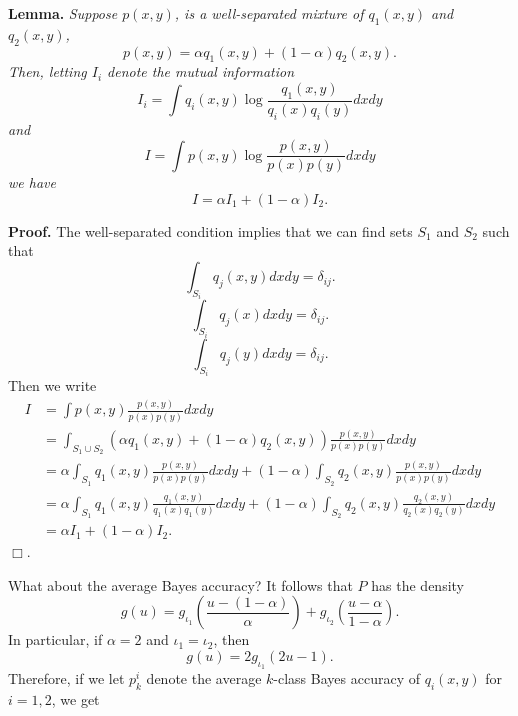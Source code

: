 \documentclass[12pt]{article}
\begin{document}
\noindent\textbf{Lemma.}\emph{
Suppose $p(x, y)$, is a well-separated mixture of $q_1(x, y)$ and $q_2(x, y)$,
\[
p(x, y) = \alpha q_1(x, y) + (1-\alpha) q_2(x, y).
\]
Then, letting $I_i$ denote the mutual information
\[
I_i = \int q_i(x, y) \log \frac{q_1(x, y)}{q_i(x) q_i(y)} dx dy
\]
and
\[
I = \int p(x, y) \log \frac{p(x, y)}{p(x) p(y)} dx dy
\]
we have
\[
I = \alpha I_1 + (1-\alpha) I_2.
\]
}

\noindent\textbf{Proof.}
The well-separated condition implies that we can find sets $S_1$ and $S_2$ such that
\[
\int_{S_i} q_j(x, y) dx dy = \delta_{ij}.
\]
\[
\int_{S_i} q_j(x) dx dy = \delta_{ij}.
\]
\[
\int_{S_i} q_j(y) dx dy = \delta_{ij}.
\]
Then we write
\begin{align*}
I &= \int p(x, y) \frac{p(x, y)}{p(x)p(y)}dx dy
\\&= \int_{S_1 \cup S_2} (\alpha q_1(x, y) + (1-\alpha) q_2(x, y))\frac{p(x, y)}{p(x)p(y)}dx dy
\\&= \alpha \int_{S_1}q_1(x, y) \frac{p(x, y)}{p(x)p(y)}dx dy + (1-\alpha) \int_{S_2}q_2(x, y) \frac{p(x, y)}{p(x)p(y)}dx dy
\\&= \alpha \int_{S_1}q_1(x, y) \frac{q_1(x, y)}{q_1(x)q_1(y)}dx dy + (1-\alpha) \int_{S_2}q_2(x, y) \frac{q_2(x, y)}{q_2(x)q_2(y)}dx dy\\&= \alpha I_1 + (1-\alpha) I_2.
\end{align*}
$\Box$.

What about the average Bayes accuracy?
It follows that $P$ has the density
\[
g(u) = g_{\iota_1}(\frac{u - (1-\alpha)}{\alpha} ) + g_{\iota_2}(\frac{u - \alpha}{1-\alpha} ).
\]
In particular, if $\alpha = 2$ and $\iota_1 = \iota_2$, then
\[
g(u) = 2 g_{\iota_1}(2u - 1).
\]
Therefore, if we let $p_k^i$ denote the average $k$-class Bayes accuracy of $q_i(x, y)$ for $i = 1,2$, we get
\end{document}
